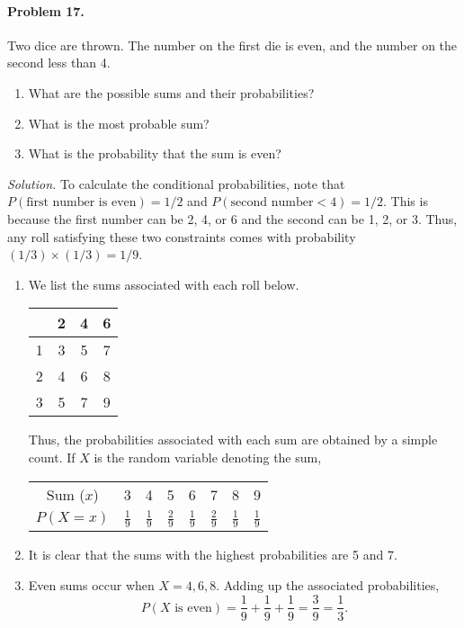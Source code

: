 \documentclass[10pt]{article}
\begin{document}
        \paragraph{Problem 17.} Two dice are thrown. The number on the first die is even, and the number on the second less than 4.
        \begin{enumerate}
                \item What are the possible sums and their probabilities?
                \item What is the most probable sum?
                \item What is the probability that the sum is even?
        \end{enumerate}

        \textit{Solution.} To calculate the conditional probabilities, note that $P(\text{first number is even}) = 1 /2$ and
        $P(\text{second number} < 4) = 1 /2$. This is because the first number can be 2, 4, or 6 and the second can be 1, 2, or 3.
        Thus, any roll satisfying these two constraints comes with probability $(1 /3)\times(1 /3) = 1 /9$.
        \begin{enumerate}
                \item We list the sums associated with each roll below.
                \begin{center}
                \begin{tabular}{c|ccc}
                          & 2 & 4 & 6 \\\hline
                        1 & 3 & 5 & 7 \\
                        2 & 4 & 6 & 8 \\
                        3 & 5 & 7 & 9
                \end{tabular}
                \end{center}
                Thus, the probabilities associated with each sum are obtained by a simple count.
                If $X$ is the random variable denoting the sum,
                \begin{center}
                \begin{tabular}{c|ccccccc}
                        Sum ($x$)  & 3 & 4 & 5 & 6 & 7 & 8 & 9 \\
                        $P(X = x)$ & $\frac{1}{9}$ & $\frac{1}{9}$ & $\frac{2}{9}$ & $\frac{1}{9}$ & $\frac{2}{9}$ & $\frac{1}{9}$ & $\frac{1}{9}$
                \end{tabular}
                \end{center}

                \item It is clear that the sums with the highest probabilities are 5 and 7.

                \item Even sums occur when $X = 4, 6, 8$. Adding up the associated probabilities,
                \[
                        P(X \text{ is even}) = \frac{1}{9} + \frac{1}{9} + \frac{1}{9} = \frac{3}{9} = \frac{1}{3}.
                \]
        \end{enumerate}
\end{document}
